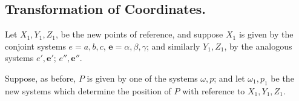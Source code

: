 \documentclass[11pt]{article}
\begin{document}
\subsection*{Transformation of Coordinates.}

Let $X_1, Y_1, Z_1$, be the new points of reference, and suppose $X_1$ is given by the conjoint systems $e = a, b, c$, $\mathbf{e} = \alpha, \beta, \gamma$; and similarly $Y_1, Z_1$, by the analogous systems $e', \mathbf{e}'$; $e'', \mathbf{e}''$.

\newpage
\setcounter{page}{221}

Suppose, as before, $P$ is given by one of the systems $\omega, p$; and let $\omega_1, p_1$ be the new systems which determine the position of $P$ with reference to $X_1, Y_1, Z_1$.
\end{document}

